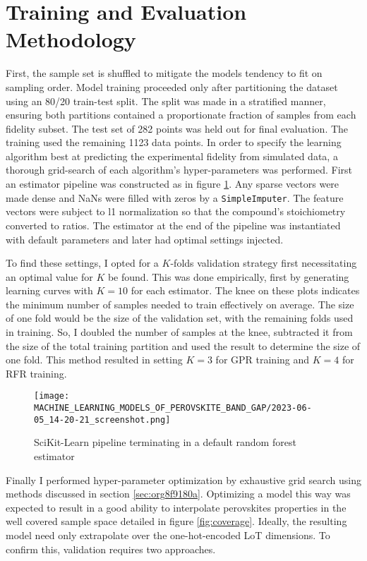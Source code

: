 \section{Training and Evaluation Methodology}
\label{sec:org3f842dd}
First, the sample set is shuffled to mitigate the models tendency to fit on sampling order.
Model training proceeded only after partitioning the dataset using an 80/20 train-test split.
The split was made in a stratified manner, ensuring both partitions contained a proportionate fraction of samples from each fidelity subset.
The test set of 282 points was held out for final evaluation.
The training used the remaining 1123 data points.
In order to specify the learning algorithm best at predicting the experimental fidelity from simulated data, a thorough grid-search of each algorithm's hyper-parameters was performed.
First an estimator pipeline was constructed as in figure \ref{fig:pipe}.
Any sparse vectors were made dense and NaNs were filled with zeros by a \texttt{SimpleImputer}.
The feature vectors were subject to l1 normalization so that the compound's stoichiometry converted to ratios.
The estimator at the end of the pipeline was instantiated with default parameters and later had optimal settings injected.

To find these settings, I opted for a \(K\)-folds validation strategy first necessitating an optimal value for \(K\) be found.
This was done empirically, first by generating learning curves with \(K=10\) for each estimator.
The knee on these plots indicates the minimum number of samples needed to train effectively on average.
The size of one fold would be the size of the validation set, with the remaining folds used in training.
So, I doubled the number of samples at the knee, subtracted it from the size of the total training partition and used the result to determine the size of one fold.
This method resulted in setting \(K = 3\) for GPR training and \(K = 4\) for RFR training.

\begin{figure}[htbp]
\centering
\texttt{[image: MACHINE\_LEARNING\_MODELS\_OF\_PEROVSKITE\_BAND\_GAP/2023-06-05\_14-20-21\_screenshot.png]}
\caption{\label{fig:pipe} SciKit-Learn pipeline terminating in a default random forest estimator}
\end{figure}

Finally I performed hyper-parameter optimization by exhaustive grid search using methods discussed in section \ref{sec:org8f9180a}.
Optimizing a model this way was expected to result in a good ability to interpolate perovskites properties in the well covered sample space detailed in figure \ref{fig:coverage}.
Ideally, the resulting model need only extrapolate over the one-hot-encoded LoT dimensions.
To confirm this, validation requires two approaches.

